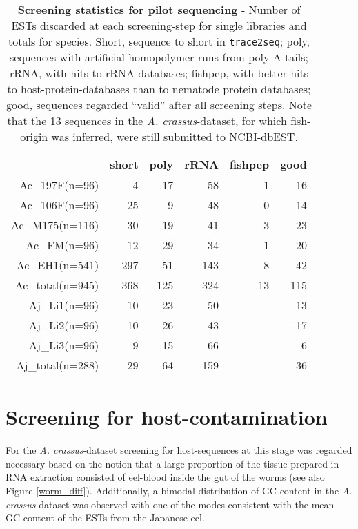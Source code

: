 \small\begin{table}[ht]
\begin{center}
\begin{tabular}{rrrrrr}
  \hline
 & short & poly & rRNA & fishpep & good \\ 
  \hline
Ac\_197F(n=96) &   4 &  17 &  58 &   1 &  16 \\ 
  Ac\_106F(n=96) &  25 &   9 &  48 &   0 &  14 \\ 
  Ac\_M175(n=116) &  30 &  19 &  41 &   3 &  23 \\ 
  Ac\_FM(n=96) &  12 &  29 &  34 &   1 &  20 \\ 
  Ac\_EH1(n=541) & 297 &  51 & 143 &   8 &  42 \\ 
  Ac\_total(n=945) & 368 & 125 & 324 &  13 & 115 \\ 
  Aj\_Li1(n=96) &  10 &  23 &  50 &  &  13 \\ 
  Aj\_Li2(n=96) &  10 &  26 &  43 &  &  17 \\ 
  Aj\_Li3(n=96) &   9 &  15 &  66 &  &   6 \\ 
  Aj\_total(n=288) &  29 &  64 & 159 &  &  36 \\ 
   \hline
\end{tabular}
\caption[Screening statistics for pilot sequencing] {\textbf{Screening
    statistics for pilot sequencing} - Number of ESTs discarded at
  each screening-step for single libraries and totals for
  species. Short, sequence to short in \texttt{trace2seq}; poly,
  sequences with artificial homopolymer-runs from poly-A tails; rRNA,
  with hits to rRNA databases; fishpep, with better hits to
  host-protein-databases than to nematode protein databases; good,
  sequences regarded ``valid'' after all screening steps. Note that
  the 13 sequences in the \textit{A. crassus}-dataset, for which
  fish-origin was inferred, were still submitted to NCBI-dbEST.}

\label{tab:num}
\end{center}
\end{table}
\normalsize

\section{Screening for host-contamination}
\label{host-pil}

For the \textit{A. crassus}-dataset screening for host-sequences at
this stage was regarded necessary based on the notion that a large
proportion of the tissue prepared in RNA extraction consisted of
eel-blood inside the gut of the worms (see also Figure
\ref{worm_diff}). Additionally, a bimodal distribution of GC-content
in the \textit{A. crassus}-dataset was observed with one of the modes
consistent with the mean GC-content of the ESTs from the Japanese eel.

